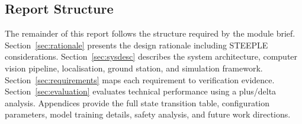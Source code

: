 \subsection{Report Structure}\label{sec:report-structure}

The remainder of this report follows the structure required by the module brief. Section~\ref{sec:rationale} presents the design rationale including STEEPLE considerations. Section~\ref{sec:sysdesc} describes the system architecture, computer vision pipeline, localisation, ground station, and simulation framework. Section~\ref{sec:requirements} maps each requirement to verification evidence. Section~\ref{sec:evaluation} evaluates technical performance using a plus/delta analysis. Appendices provide the full state transition table, configuration parameters, model training details, safety analysis, and future work directions.
